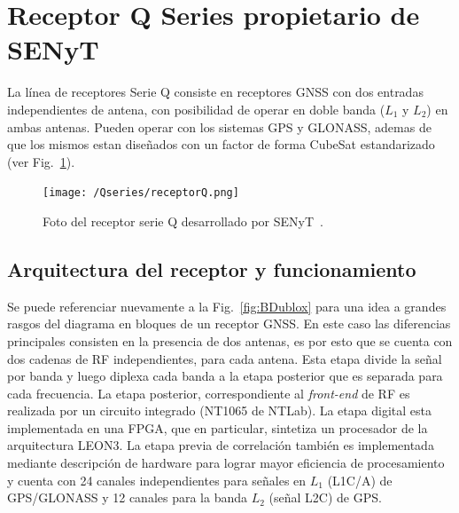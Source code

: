 \documentclass[a4paper,12pt,oneside,onecolumn,final,openright]{book}%
\begin{document}
\section{Receptor Q Series propietario de SENyT}
	La línea de receptores Serie Q consiste en receptores GNSS con dos entradas independientes de antena, con posibilidad de operar en doble banda ($L_1$ y $L_2$) en ambas antenas. Pueden operar con los sistemas GPS y GLONASS, ademas de que los mismos estan diseñados con un factor de forma CubeSat estandarizado~\cite{Qseries_1}~\cite{Qseries_2} (ver Fig.~\ref{fig:Q}).
\begin{figure}
    \centering
    \texttt{[image: /Qseries/receptorQ.png]}
    \caption{Foto del receptor serie Q desarrollado por SENyT~\cite{Qseries_2}.}
    \label{fig:Q}
\end{figure}
\subsection{Arquitectura del receptor y funcionamiento}\label{sec:Qarq}
	Se puede referenciar nuevamente a la Fig.~\ref{fig:BDublox} para una idea a grandes rasgos del diagrama en bloques de un receptor GNSS. En este caso las diferencias principales consisten en la presencia de dos antenas, es por esto que se cuenta con dos cadenas de RF independientes, para cada antena. Esta etapa divide la señal por banda y luego diplexa cada banda a la etapa posterior que es separada para cada frecuencia. La etapa posterior, correspondiente al \textit{front-end} de RF es realizada por un circuito integrado (NT1065 de NTLab). La etapa digital esta implementada en una FPGA, que en particular, sintetiza un procesador de la arquitectura LEON3. La etapa previa de correlación también es implementada mediante descripción de hardware para lograr mayor eficiencia de procesamiento y cuenta con 24 canales independientes para señales en $L_1$ (L1C/A) de GPS/GLONASS y 12 canales para la banda $L_2$ (señal L2C) de GPS.
\end{document}
